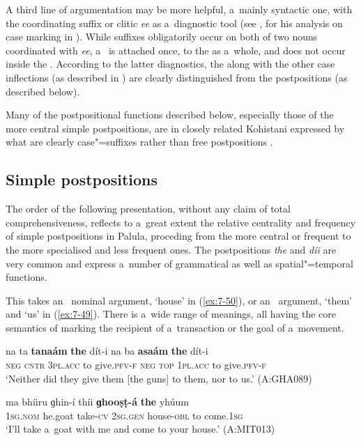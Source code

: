 A third line of argumentation may be more helpful, a~mainly syntactic one, with the coordinating suffix or clitic \textit{ee} as a~diagnostic tool (see \citealt[77]{baart1999a}, for his analysis on case marking in \iliGawri). While  suffixes obligatorily occur on both of two nouns coordinated with \textit{ee}, a~ is attached once, to the  as a~whole, and does not occur inside the . According to the latter diagnostics, the  along with the other case inflections (as described in ) are clearly distinguished from the postpositions (as described below). 

\largerpage[-1]
Many of the postpositional functions described below, especially those of the more central simple postpositions, are in closely related Kohistani \iliShina \citep[115--130]{schmidtkohistani2001} expressed by what are clearly  case"=suffixes rather than free postpositions . 


\subsection{Simple postpositions}
\label{subsec:7-2-2}

The order of the following presentation, without any claim of total comprehensiveness, reflects to a~great extent the relative centrality and frequency of simple postpositions in Palula, proceding from the more central or frequent to the more specialised and less frequent ones. The postpositions \textit{the} and \textit{díi} are very common and express a~number of grammatical as well as spatial"=temporal functions. 


 This  takes an~ nominal argument, `house' in (\ref{ex:7-50}), or an~  argument, `them' and `us' in (\ref{ex:7-49}). There is a~wide range of meanings, all having the core semantics of marking the recipient of a~transaction or the goal of a~movement. 
\begin{exe}
\ex
\label{ex:7-49}
\gll na ta \textbf{tanaám} \textbf{the} dít-i na ba  \textbf{asaám} \textbf{the} dít-i \\
\textsc{neg} \textsc{cntr} \textsc{3pl.acc} to give.\textsc{pfv-f} \textsc{neg} \textsc{top} \textsc{1pl.acc} to give.\textsc{pfv-f} \\
\glt `Neither did they give them [the guns] to them, nor to us.' (A:GHA089)
\end{exe}
\begin{exe}
\ex
\label{ex:7-50}
\gll ma bhíiru ɡhin-í thíi \textbf{ɡhooṣṭ-á} \textbf{the} yhúum \\
\textsc{1sg.nom} he.goat take-\textsc{cv} \textsc{2sg.gen} house-\textsc{obl} to come.\textsc{1sg} \\
\glt `I'll take a~goat with me and come to your house.' (A:MIT013)
\end{exe}

